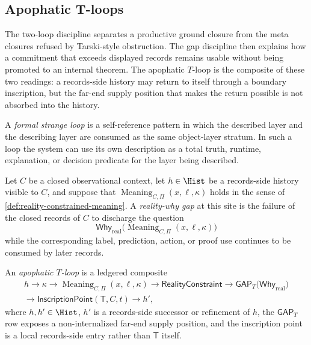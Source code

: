 \subsection{Apophatic T-loops}
\label{subsec:philosophy-apophatic-t-loops}

The two-loop discipline separates a productive ground closure from
the meta closures refused by Tarski-style obstruction. The gap
discipline then explains how a commitment that exceeds displayed
records remains usable without being promoted to an internal theorem.
The apophatic $T$-loop is the composite of these two readings: a
records-side history may return to itself through a boundary
inscription, but the far-end supply position that makes the return
possible is not absorbed into the history.

\begin{definition}
\label{def:philosophy-formal-strange-loop}
A \emph{formal strange loop} is a self-reference pattern in which the
described layer and the describing layer are consumed as the same
object-layer stratum. In such a loop the system can use its own
description as a total truth, runtime, explanation, or decision
predicate for the layer being described.
\end{definition}

\begin{definition}
\label{def:philosophy-reality-why-gap}
Let $C$ be a closed observational context, let $h\in\Hist$ be a
records-side history visible to $C$, and suppose that
$\operatorname{Meaning}_{C,\Pi}(x,\ell,\kappa)$ holds in the sense of
\autoref{def:reality-constrained-meaning}. A \emph{reality-why gap} at
this site is the failure of the closed records of $C$ to discharge the
question
$$
\mathsf{Why}_{\mathrm{real}}
\bigl(\operatorname{Meaning}_{C,\Pi}(x,\ell,\kappa)\bigr)
$$
while the corresponding label, prediction, action, or proof use
continues to be consumed by later records.
\end{definition}

\begin{definition}
\label{def:philosophy-apophatic-t-loop}
An \emph{apophatic $T$-loop} is a ledgered composite
$$
\begin{gathered}
h
\longrightarrow
\kappa
\longrightarrow
\operatorname{Meaning}_{C,\Pi}(x,\ell,\kappa)
\longrightarrow
\mathsf{RealityConstraint}
\longrightarrow
\mathsf{GAP}_{T}
\bigl(\mathsf{Why}_{\mathrm{real}}\bigr)\\
\longrightarrow
\mathsf{InscriptionPoint}(\mathsf{T},C,t)
\longrightarrow
h',
\end{gathered}
$$
where $h,h'\in\Hist$, $h'$ is a records-side successor or refinement of
$h$, the $\mathsf{GAP}_{T}$ row exposes a non-internalized far-end
supply position, and the inscription point is a local records-side
entry rather than $\mathsf{T}$ itself.
\end{definition}

